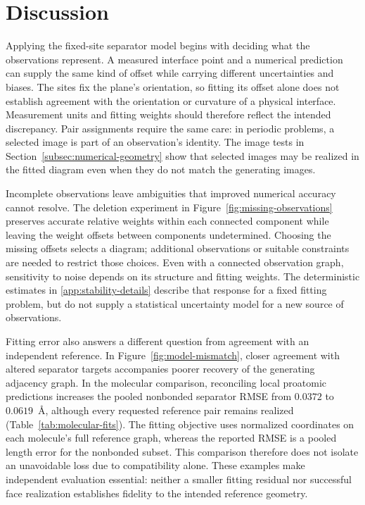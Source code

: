 \section{Discussion}
\label{sec:discussion}

Applying the fixed-site separator model begins with deciding what the observations represent. A measured interface point and a numerical prediction can supply the same kind of offset while carrying different uncertainties and biases. The sites fix the plane's orientation, so fitting its offset alone does not establish agreement with the orientation or curvature of a physical interface. Measurement units and fitting weights should therefore reflect the intended discrepancy. Pair assignments require the same care: in periodic problems, a selected image is part of an observation's identity. The image tests in Section~\ref{subsec:numerical-geometry} show that selected images may be realized in the fitted diagram even when they do not match the generating images.

Incomplete observations leave ambiguities that improved numerical accuracy cannot resolve. The deletion experiment in Figure~\ref{fig:missing-observations} preserves accurate relative weights within each connected component while leaving the weight offsets between components undetermined. Choosing the missing offsets selects a diagram; additional observations or suitable constraints are needed to restrict those choices. Even with a connected observation graph, sensitivity to noise depends on its structure and fitting weights. The deterministic estimates in \ref{app:stability-details} describe that response for a fixed fitting problem, but do not supply a statistical uncertainty model for a new source of observations.

Fitting error also answers a different question from agreement with an independent reference. In Figure~\ref{fig:model-mismatch}, closer agreement with altered separator targets accompanies poorer recovery of the generating adjacency graph. In the molecular comparison, reconciling local proatomic predictions increases the pooled nonbonded separator RMSE from $0.0372$ to $0.0619$~\AA{}, although every requested reference pair remains realized (Table~\ref{tab:molecular-fits}). The fitting objective uses normalized coordinates on each molecule's full reference graph, whereas the reported RMSE is a pooled length error for the nonbonded subset. This comparison therefore does not isolate an unavoidable loss due to compatibility alone. These examples make independent evaluation essential: neither a smaller fitting residual nor successful face realization establishes fidelity to the intended reference geometry.

